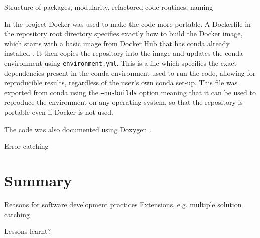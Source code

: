 \documentclass[12pt]{article}
\begin{document}
Structure of packages, modularity, refactored code routines, naming

In the project Docker was used to make the code more portable.
A Dockerfile in the repository root directory specifies exactly how to build the Docker image, which starts with a basic image from Docker Hub that has conda already installed \cite{docker}.
It then copies the repository into the image and updates the conda environment using \texttt{environment.yml}.
This is a file which specifies the exact dependencies present in the conda environment used to run the code, allowing for reproducible results, regardless of the user's own conda set-up.
This file was exported from conda using the \texttt{--no-builds} option meaning that it can be used to reproduce the environment on any operating system, so that the repository is portable even if Docker is not used.

The code was also documented using Doxygen \cite{doxygen}.

Error catching

\section*{Summary}

Reasons for software development practices
Extensions, e.g. multiple solution catching

Lessons learnt?


\end{document}
